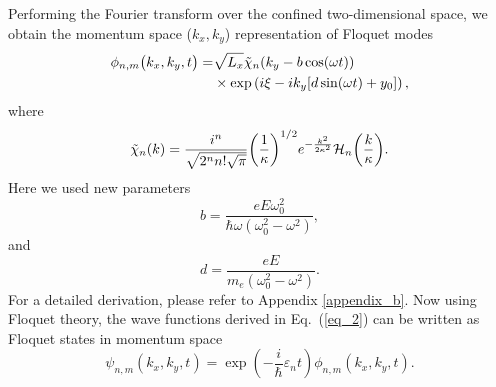 Performing the Fourier transform over the confined two-dimensional space, we obtain the momentum space ($k_x,k_y$) representation of Floquet modes
\begin{equation} \label{eq_9}
  \begin{aligned}
    \phi_{n,m}\big(k_x,k_y,t\big)  = &
    {\sqrt{L_x}}
    \tilde{\chi}_{n}\qty(k_y - b\cos(\omega t)) \\
    & \times
    \text{exp}\left(
      i\xi
      -ik_y  \qty[d\sin(\omega t) + y_0]
    \right),
  \end{aligned}
\end{equation}
where
\begin{equation} \label{eq_10}
  \tilde{\chi}_{n}\qty(k) =
  \frac{i^n}{\sqrt{2^{n} n! \sqrt{\pi}}}
  \qty(\frac{1}{\kappa})^{1/2}
  e^{-\frac{k^2}{2 \kappa^2}}
  \mathcal{H}_{n} \qty(\frac{k}{\kappa}).
\end{equation}
Here we used new parameters
\begin{equation} \label{eq_11a}
  b =
  \frac{eE\omega_0^2}{\hbar\omega(\omega_0^2 - \omega^2)},
\end{equation}
and
\begin{equation} \label{eq_11b}
  d =
 \frac{eE}{m_e(\omega_0^2 - \omega^2)}.
\end{equation}
For a detailed derivation, please refer to Appendix \ref{appendix_b}. Now using Floquet theory, the wave functions derived in Eq.~(\ref{eq_2}) can be written as Floquet states in momentum space
\begin{equation} \label{eq_12}
  \psi_{n,m}(k_x,k_y,t) =
  \exp(-\frac{i}{\hbar}\varepsilon_{n}t)   \phi_{n,m} (k_x,k_y,t).
\end{equation}
